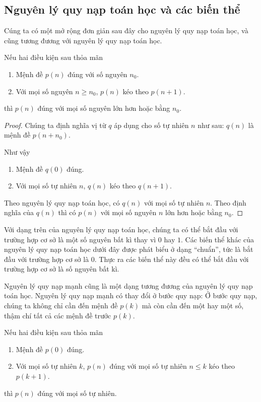 \subsection{Nguyên lý quy nạp toán học và các biến thể}

Cúng ta có một mở rộng đơn giản sau đây cho nguyên lý quy nạp toán học, và cũng tương đương với nguyên lý quy nạp toán học.

\begin{theorem}
    Nếu hai điều kiện sau thỏa mãn
    \begin{enumerate}[label={(\roman*)}]
        \item Mệnh đề $p(n)$ đúng với số nguyên $n_{0}$.
        \item Với mọi số nguyên $n\geq n_{0}$, $p(n)$ kéo theo $p(n + 1)$.
    \end{enumerate}

    thì $p(n)$ đúng với mọi số nguyên lớn hơn hoặc bằng $n_{0}$.
\end{theorem}

\begin{proof}
    Chúng ta định nghĩa vị từ $q$ áp dụng cho số tự nhiên $n$ như sau: $q(n)$ là mệnh đề $p(n + n_{0})$.

    Như vậy
    \begin{enumerate}[label={(\roman*)}]
        \item Mệnh đề $q(0)$ đúng.
        \item Với mọi số tự nhiên $n$, $q(n)$ kéo theo $q(n + 1)$.
    \end{enumerate}

    Theo nguyên lý quy nạp toán học, có $q(n)$ với mọi số tự nhiên $n$. Theo định nghĩa của $q(n)$ thì có $p(n)$ với mọi số nguyên $n$ lớn hơn hoặc bằng $n_{0}$.
\end{proof}

Với dạng trên của nguyên lý quy nạp toán học, chúng ta có thể bắt đầu với trường hợp cơ sở là một số nguyên bất kì thay vì $0$ hay $1$. Các biến thể khác của nguyên lý quy nạp toán học dưới đây được phát biểu ở dạng ``chuẩn'', tức là bắt đầu với trường hợp cơ sở là $0$. Thực ra các biến thể này đều có thể bắt đầu với trường hợp cơ sở là số nguyên bất kì.

Nguyên lý quy nạp mạnh cũng là một dạng tương đương của nguyên lý quy nạp toán học. Nguyên lý quy nạp mạnh có thay đổi ở bước quy nạp: Ở bước quy nạp, chúng ta không chỉ cần đến mệnh đề $p(k)$ mà còn cần đến một hay một số, thậm chí tất cả các mệnh đề trước $p(k)$.
\begin{theorem}
    Nếu hai điều kiện sau thỏa mãn
    \begin{enumerate}[label={(\roman*)}]
        \item Mệnh đề $p(0)$ đúng.
        \item Với mọi số tự nhiên $k$, $p(n)$ đúng với mọi số tự nhiên $n\leq k$ kéo theo $p(k+1)$.
    \end{enumerate}

    thì $p(n)$ đúng với mọi số tự nhiên.
\end{theorem}

